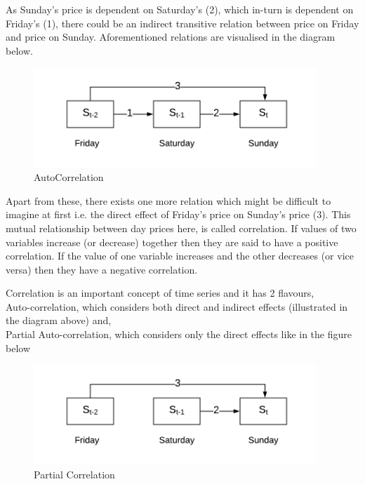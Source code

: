 \documentclass[12pt]{report}
\begin{document}
As Sunday’s price is dependent on Saturday’s (2), which in-turn is dependent on Friday’s (1), there could be an indirect transitive relation between price on Friday and price on Sunday.
Aforementioned relations are visualised in the diagram below.

\begin{figure}[H]%
  \begin {center}
  \includegraphics[width=0.95\textwidth]{images/prices_chart.png}
  \caption{AutoCorrelation}
  \label{fig:ecg}
  \end {center}
\end{figure}

Apart from these, there exists one more relation which might be difficult to imagine at first i.e. the direct effect of Friday’s price on Sunday’s price (3).
This mutual relationship between day prices here, is called correlation. If values of two variables increase (or decrease) together then they are said to have a positive correlation. If the value of one variable increases and the other decreases (or vice versa) then they have a negative correlation.

Correlation is an important concept of time series and it has 2 flavours,\\
Auto-correlation, which considers both direct and indirect effects (illustrated in the diagram above) and,\\
Partial Auto-correlation, which considers only the direct effects like in the figure below

\begin{figure}[H]%
  \begin {center}
  \includegraphics[width=0.95\textwidth]{images/partial_c.png}
  \caption{Partial Correlation}
  \label{fig:ecg}
  \end {center}
\end{figure}
\end{document}
